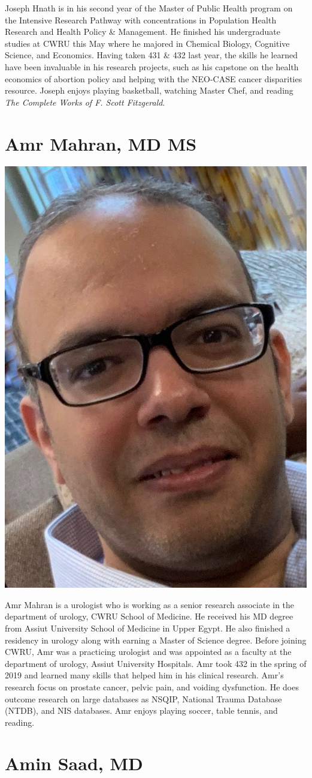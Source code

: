 \documentclass[
]{book}
\begin{document}
Joseph Hnath is in his second year of the Master of Public Health program on the Intensive Research Pathway with concentrations in Population Health Research and Health Policy \& Management. He finished his undergraduate studies at CWRU this May where he majored in Chemical Biology, Cognitive Science, and Economics. Having taken 431 \& 432 last year, the skills he learned have been invaluable in his research projects, such as his capstone on the health economics of abortion policy and helping with the NEO-CASE cancer disparities resource. Joseph enjoys playing basketball, watching Master Chef, and reading \emph{The Complete Works of F. Scott Fitzgerald}.

\hypertarget{amr-mahran-md-ms}{%
\section{Amr Mahran, MD MS}\label{amr-mahran-md-ms}}

\includegraphics[width=0.3\linewidth]{figures/Amr}

Amr Mahran is a urologist who is working as a senior research associate in the department of urology, CWRU School of Medicine. He received his MD degree from Assiut University School of Medicine in Upper Egypt. He also finished a residency in urology along with earning a Master of Science degree. Before joining CWRU, Amr was a practicing urologist and was appointed as a faculty at the department of urology, Assiut University Hospitals. Amr took 432 in the spring of 2019 and learned many skills that helped him in his clinical research. Amr's research focus on prostate cancer, pelvic pain, and voiding dysfunction. He does outcome research on large databases as NSQIP, National Trauma Database (NTDB), and NIS databases. Amr enjoys playing soccer, table tennis, and reading.

\hypertarget{amin-saad-md}{%
\section{Amin Saad, MD}\label{amin-saad-md}}
\end{document}
